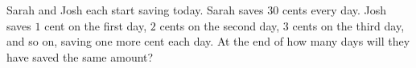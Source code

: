 Sarah and Josh each start saving today. Sarah saves $30$ cents every day. Josh saves $1$ cent on the first day, $2$ cents on the second day, $3$ cents on the third day, and so on, saving one more cent each day. At the end of how many days will they have saved the same amount?

